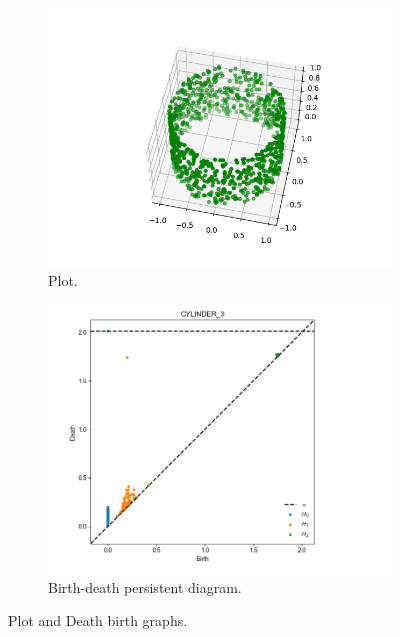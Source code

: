 \documentclass[11pt,a4paper]{report}
\begin{document}
              \begin{figure}[H]
                \centering
                \begin{subfigure}[b]{0.45\linewidth}
                  \includegraphics[width=\linewidth]{./ripser/on_cylinder.png}
                  \caption{Plot.}
                \end{subfigure}
                \begin{subfigure}[b]{0.45\linewidth}
                  \includegraphics[width=\linewidth]{./ripser/on_cylinder_pers_homology.jpg}
                  \caption{Birth-death persistent diagram.}
                \end{subfigure}
                \caption{Plot and Death birth graphs.}
                \label{fig: plot death}
              \end{figure}
\end{document}
